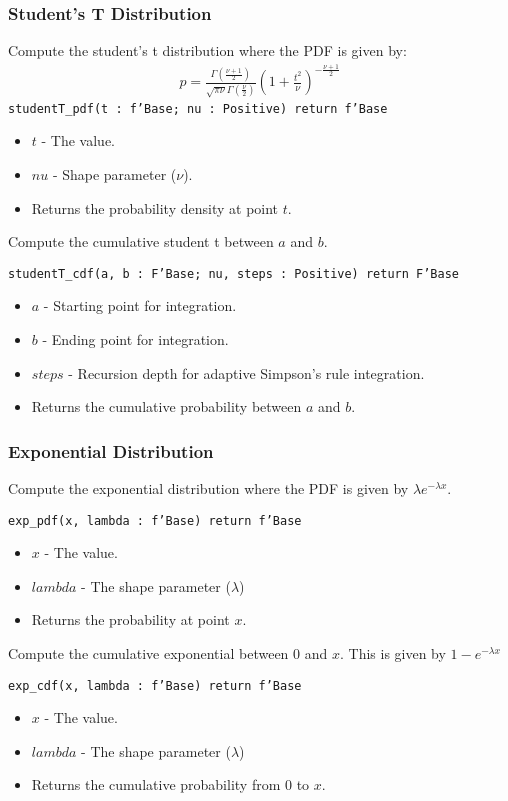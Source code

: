 \documentclass[10pt, openany]{book}
\newcommand{\function}[1]{\texttt{#1}}
\begin{document}
\subsubsection{Student's T Distribution}
Compute the student's t distribution where the PDF is given by:
\begin{align*}
  p = \frac{\Gamma(\frac{\nu+1}{2})}{\sqrt{\pi\nu}\Gamma(\frac{\nu}{2})}(1+\frac{t^2}{\nu})^{-\frac{\nu+1}{2}}
\end{align*}
\function{studentT\_pdf(t : f'Base; nu : Positive) return f'Base}
\begin{itemize}
  \item $t$ - The value.
  \item $nu$ - Shape parameter ($\nu$).
  \item Returns the probability density at point $t$.
\end{itemize}

Compute the cumulative student t between $a$ and $b$.

\function{studentT\_cdf(a, b : F'Base; nu, steps : Positive) return F'Base}
\begin{itemize}
  \item $a$ - Starting point for integration.
  \item $b$ - Ending point for integration.
  \item $steps$ - Recursion depth for adaptive Simpson's rule integration.
  \item Returns the cumulative probability between $a$ and $b$.
\end{itemize}

\subsubsection{Exponential Distribution}
Compute the exponential distribution where the PDF is given by $\lambda e^{-\lambda x}$.

\function{exp\_pdf(x, lambda : f'Base) return f'Base}
\begin{itemize}
  \item $x$ - The value.
  \item $lambda$ - The shape parameter ($\lambda$)
  \item Returns the probability at point $x$.
\end{itemize}

Compute the cumulative exponential between $0$ and $x$.  This is given by $1-e^{-\lambda x}$

\function{exp\_cdf(x, lambda : f'Base) return f'Base}
\begin{itemize}
  \item $x$ - The value.
  \item $lambda$ - The shape parameter ($\lambda$)
  \item Returns the cumulative probability from $0$ to $x$.
\end{itemize}
\end{document}
